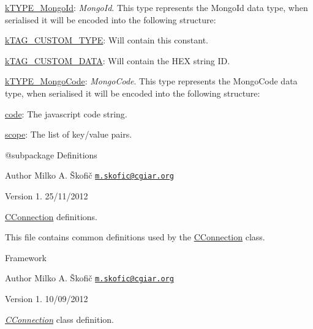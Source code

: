 \begin{DoxyItemize}
\item {\ttfamily \hyperlink{}{k\-T\-Y\-P\-E\-\_\-\-Mongo\-Id}}\-: {\itshape Mongo\-Id}. This type represents the Mongo\-Id data type, when serialised it will be encoded into the following structure\-: 
\begin{DoxyItemize}
\item {\ttfamily \hyperlink{}{k\-T\-A\-G\-\_\-\-C\-U\-S\-T\-O\-M\-\_\-\-T\-Y\-P\-E}}\-: Will contain this constant. 
\item {\ttfamily \hyperlink{}{k\-T\-A\-G\-\_\-\-C\-U\-S\-T\-O\-M\-\_\-\-D\-A\-T\-A}}\-: Will contain the H\-E\-X string I\-D. 
\end{DoxyItemize}
\item {\ttfamily \hyperlink{}{k\-T\-Y\-P\-E\-\_\-\-Mongo\-Code}}\-: {\itshape Mongo\-Code}. This type represents the Mongo\-Code data type, when serialised it will be encoded into the following structure\-: 
\begin{DoxyItemize}
\item {\ttfamily \hyperlink{}{code}}\-: The javascript code string. 
\item {\ttfamily \hyperlink{}{scope}}\-: The list of key/value pairs. 
\end{DoxyItemize}
\end{DoxyItemize}

\begin{DoxyVerb} @subpackage        Definitions
\end{DoxyVerb}


\begin{DoxyAuthor}{Author}
Milko A. Škofič \href{mailto:m.skofic@cgiar.org}{\tt m.\-skofic@cgiar.\-org} 
\end{DoxyAuthor}
\begin{DoxyVersion}{Version}
1. 25/11/2012
\end{DoxyVersion}
\hyperlink{class_c_connection}{C\-Connection} definitions.

This file contains common definitions used by the \hyperlink{class_c_connection}{C\-Connection} class.

Framework

\begin{DoxyAuthor}{Author}
Milko A. Škofič \href{mailto:m.skofic@cgiar.org}{\tt m.\-skofic@cgiar.\-org} 
\end{DoxyAuthor}
\begin{DoxyVersion}{Version}
1. 10/09/2012
\end{DoxyVersion}
{\itshape \hyperlink{class_c_connection}{C\-Connection}} class definition.

